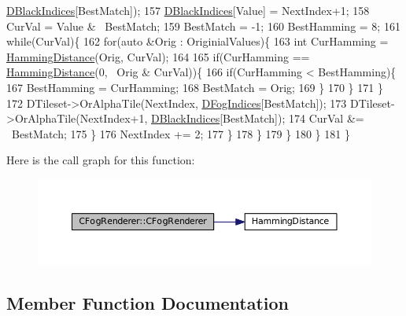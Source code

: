 \begin{DoxyCode}
      \hyperlink{classCFogRenderer_a09e3b546abbe52cc9addd1edfcc5ea9c}{DBlackIndices}[BestMatch]);
157                     \hyperlink{classCFogRenderer_a09e3b546abbe52cc9addd1edfcc5ea9c}{DBlackIndices}[Value] = NextIndex+1;
158                     CurVal = Value & ~BestMatch;
159                     BestMatch = -1;
160                     BestHamming = 8;    
161                     \textcolor{keywordflow}{while}(CurVal)\{
162                         \textcolor{keywordflow}{for}(\textcolor{keyword}{auto} &Orig : OriginialValues)\{
163                             \textcolor{keywordtype}{int} CurHamming = \hyperlink{FogRenderer_8cpp_a0cf7f6be616e12a84cc37fd98785fd52}{HammingDistance}(Orig, CurVal);
164                             
165                             \textcolor{keywordflow}{if}(CurHamming == \hyperlink{FogRenderer_8cpp_a0cf7f6be616e12a84cc37fd98785fd52}{HammingDistance}(0, ~Orig & CurVal))\{
166                                 \textcolor{keywordflow}{if}(CurHamming < BestHamming)\{
167                                     BestHamming = CurHamming;
168                                     BestMatch = Orig;
169                                 \}
170                             \}
171                         \}
172                         DTileset->OrAlphaTile(NextIndex, \hyperlink{classCFogRenderer_a2028e4642e756016819aab6567800af5}{DFogIndices}[BestMatch]);
173                         DTileset->OrAlphaTile(NextIndex+1, \hyperlink{classCFogRenderer_a09e3b546abbe52cc9addd1edfcc5ea9c}{DBlackIndices}[BestMatch]);
174                         CurVal &= ~BestMatch;
175                     \}
176                     NextIndex += 2;
177                 \}
178             \}
179         \}
180     \}
181 \}
\end{DoxyCode}
Here is the call graph for this function\+:
\nopagebreak
\begin{figure}[H]
\begin{center}
\leavevmode
\includegraphics[width=350pt]{classCFogRenderer_aa802bea4a0983b7cbcacf4ebfc1cf6a3_cgraph}
\end{center}
\end{figure}


\subsection{Member Function Documentation}
\hypertarget{classCFogRenderer_aa7e0638c279ac426b9b643d26a38777e}{}\label{classCFogRenderer_aa7e0638c279ac426b9b643d26a38777e} 
